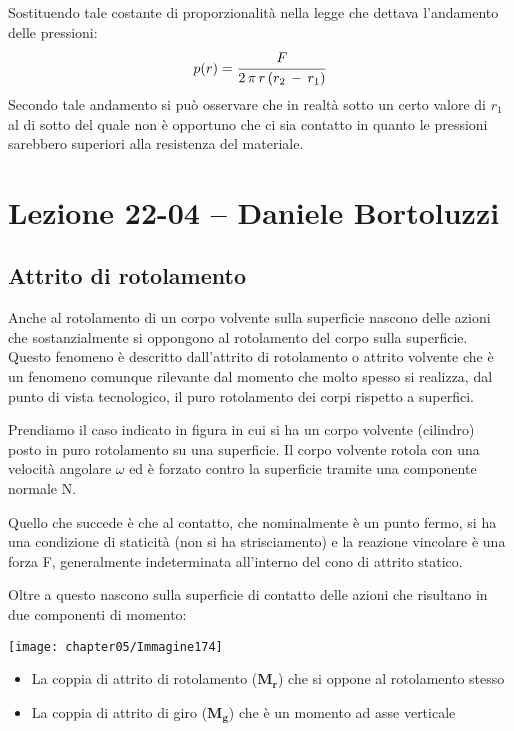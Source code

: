 Sostituendo tale costante di proporzionalità nella legge che dettava l'andamento delle pressioni:
\[p(r) = \cfrac{F}{2\,\pi\,r\,(r_2\,-\,r_1)}\]
Secondo tale andamento si può osservare che in realtà sotto un certo valore di $r_1$ al di sotto del quale non è opportuno che ci sia contatto in quanto le pressioni sarebbero superiori alla resistenza del materiale.

\section{Lezione 22-04 -- Daniele Bortoluzzi}

\subsection{Attrito di rotolamento}

Anche al rotolamento di un corpo volvente sulla superficie nascono delle azioni che sostanzialmente si oppongono al rotolamento del corpo sulla superficie. Questo fenomeno è descritto dall'attrito di rotolamento o attrito volvente che è un fenomeno comunque rilevante dal momento che molto spesso si realizza, dal punto di vista tecnologico, il puro rotolamento dei corpi rispetto a superfici.

\begin{minipage}{.65\textwidth}
Prendiamo il caso indicato in figura in cui si ha un corpo volvente (cilindro) posto in puro rotolamento su una superficie. Il corpo volvente rotola con una velocità angolare $\omega$ ed è forzato contro la superficie tramite una componente normale N.
	
Quello che succede è che al contatto, che nominalmente è un punto fermo, si ha una condizione di staticità (non si ha strisciamento) e la reazione vincolare è una forza F, generalmente indeterminata all'interno del cono di attrito statico.

Oltre a questo nascono sulla superficie di contatto delle azioni che risultano in due componenti di momento: 
\end{minipage}
\hfill
\begin{minipage}{.35\textwidth}
\centering
\texttt{[image: chapter05/Immagine174]}
\end{minipage}

\begin{itemize}
\item La coppia di attrito di rotolamento ($\mathbf{M_r}$) che si oppone al rotolamento stesso
\item La coppia di attrito di giro ($\mathbf{M_g}$) che è un momento ad asse verticale
\end{itemize}

